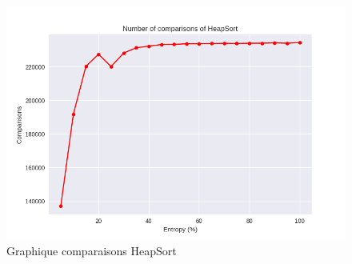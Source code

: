 \documentclass[10pt,a4paper]{article}
\begin{document}
            \begin{figure}
                \centering
                \includegraphics[width=1\textwidth]{graphique/HeapSort/GraphComparisonsHeapSort.png}
                \caption{Graphique comparaisons HeapSort}
                \label{fig:mesh1}
            \end{figure}
\end{document}
